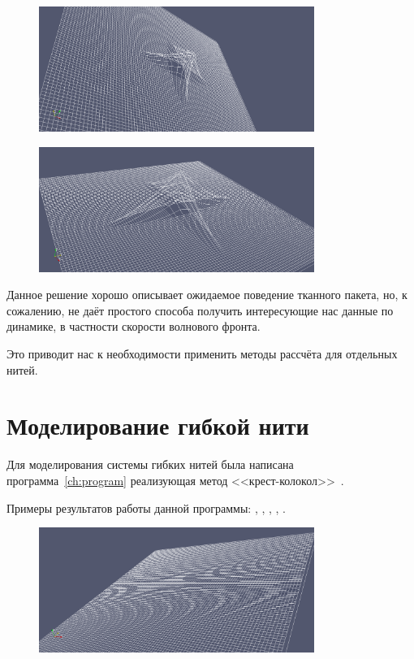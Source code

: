 \begin{figure}[H]
    \centering
    \caption{}
    \label{pic:comsol-example-4}
    \includegraphics[width=0.8\textwidth]{img/comsol/example_4.png}
\end{figure}

\begin{figure}[H]
    \centering
    \caption{}
    \label{pic:comsol-example-5}
    \includegraphics[width=0.8\textwidth]{img/comsol/example_5.png}
\end{figure}

Данное решение хорошо описывает ожидаемое поведение тканного пакета, но, к сожалению, не даёт простого способа
получить интересующие нас данные по динамике, в частности скорости волнового фронта.

Это приводит нас к необходимости применить методы рассчёта для отдельных нитей.

\section{Моделирование гибкой нити}\label{sec:model-fibers}
Для моделирования системы гибких нитей была написана программа~\ref{ch:program} реализующая метод
<<крест-колокол>>~\cite{rakhmatulin}.

Примеры результатов работы данной программы: , ,
, , .

\begin{figure}[H]
    \centering
    \caption{}
    \label{pic:fiber-example-1}
    \includegraphics[width=0.8\textwidth]{img/fiber/example_1.png}
\end{figure}

